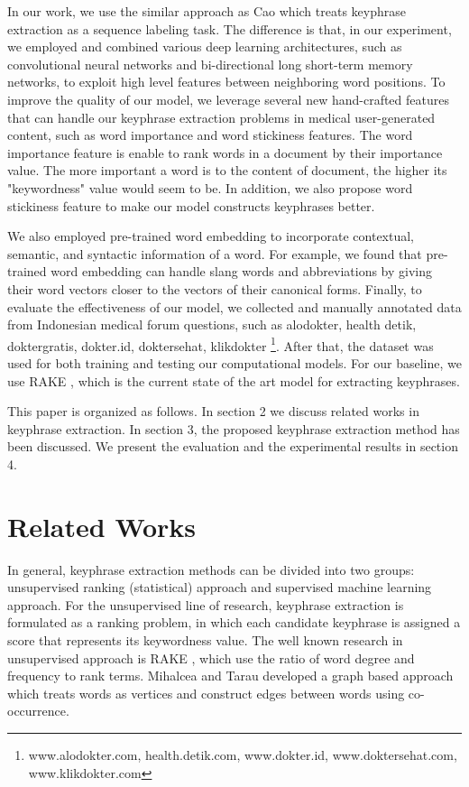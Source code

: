 In our work, we use the similar approach as Cao \cite{cao2010automatically} which treats keyphrase extraction as a sequence labeling task. The difference is that, in our experiment, we employed and combined various deep learning architectures, such as convolutional neural networks and bi-directional long short-term memory networks, to exploit high level features between neighboring word positions. To improve the quality of our model, we leverage several new hand-crafted features that can handle our keyphrase extraction problems in medical user-generated content, such as word importance and word stickiness features. The word importance feature is enable to rank words in a document by their importance value. The more important a word is to the content of document, the higher its "keywordness" value would seem to be. In addition, we also propose word stickiness feature to make our model constructs keyphrases better. 

We also employed pre-trained word embedding to incorporate contextual, semantic, and syntactic information of a word. For example, we found that pre-trained word embedding can handle slang words and abbreviations by giving their word vectors closer to the vectors of their canonical forms. Finally, to evaluate the effectiveness of our model, we collected and manually annotated data from Indonesian medical forum questions, such as alodokter, health detik, doktergratis, dokter.id, doktersehat, klikdokter \footnote{www.alodokter.com, health.detik.com, www.dokter.id, www.doktersehat.com, www.klikdokter.com}. After that, the dataset was used for both training and testing our computational models. For our baseline, we use RAKE  \cite{rake}, which is the current state of the art model for extracting keyphrases.


This paper is organized as follows.  In section 2 we discuss related works in keyphrase extraction. In section 3, the proposed keyphrase extraction method has been discussed. We present the evaluation and the experimental results in section 4. 
\fi
\section{Related Works}
In general, keyphrase extraction methods can be divided into two groups: unsupervised ranking (statistical) approach and supervised machine learning approach. For the unsupervised line of research, keyphrase extraction is formulated as a ranking problem, in which each candidate keyphrase is assigned a score that represents its keywordness value. The well known research in unsupervised approach is RAKE \cite{rake}, which use the ratio of word degree and frequency to rank terms. Mihalcea and Tarau \cite{mihalcea2004textrank} developed a graph based approach which treats words as vertices and construct edges between words using co-occurrence.

